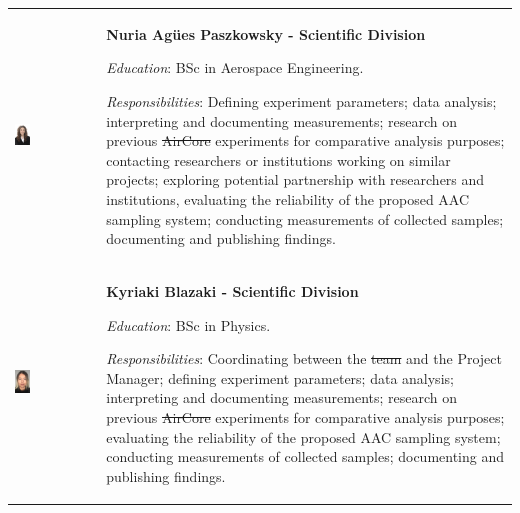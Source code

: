 \documentclass[a4paper,12pt,twoside, final]{article}
\providecommand{\DIFaddtex}[1]{{\protect\color{blue}\uwave{#1}}} %
\providecommand{\DIFdeltex}[1]{{\protect\color{red}\sout{#1}}}                      %
\providecommand{\DIFaddbegin}{} %
\providecommand{\DIFaddend}{} %
\providecommand{\DIFdelbegin}{} %
\providecommand{\DIFdelend}{} %
\providecommand{\DIFadd}[1]{\texorpdfstring{\DIFaddtex{#1}}{#1}} %
\providecommand{\DIFdel}[1]{\texorpdfstring{\DIFdeltex{#1}}{}} %
\newcommand{\DIFscaledelfig}{0.5}
\newlength{\DIFdelgraphicswidth} %
\newlength{\DIFdelgraphicsheight} %
\newcommand{\DIFaddincludegraphics}[2][]{{\color{blue}\fbox{\DIFOincludegraphics[#1]{#2}}}} %
\newcommand{\DIFdelincludegraphics}[2][]{%
\sbox{\DIFdelgraphicsbox}{\DIFOincludegraphics[#1]{#2}}%
\settoboxwidth{\DIFdelgraphicswidth}{\DIFdelgraphicsbox} %
\settoboxtotalheight{\DIFdelgraphicsheight}{\DIFdelgraphicsbox} %
\scalebox{\DIFscaledelfig}{%
\parbox[b]{\DIFdelgraphicswidth}{\usebox{\DIFdelgraphicsbox}\\[-\baselineskip] \rule{\DIFdelgraphicswidth}{0em}}\llap{\resizebox{\DIFdelgraphicswidth}{\DIFdelgraphicsheight}{%
\setlength{\unitlength}{\DIFdelgraphicswidth}%
\begin{picture}(1,1)%
\thicklines\linethickness{2pt} %
{\color[rgb]{1,0,0}\put(0,0){\framebox(1,1){}}}%
{\color[rgb]{1,0,0}\put(0,0){\line( 1,1){1}}}%
{\color[rgb]{1,0,0}\put(0,1){\line(1,-1){1}}}%
\end{picture}%
}\hspace*{3pt}}} %
} %
\DeclareRobustCommand{\DIFaddbegin}{\DIFOaddbegin \let\includegraphics\DIFaddincludegraphics} %
\DeclareRobustCommand{\DIFaddend}{\DIFOaddend \let\includegraphics\DIFOincludegraphics} %
\DeclareRobustCommand{\DIFdelbegin}{\DIFOdelbegin \let\includegraphics\DIFdelincludegraphics} %
\DeclareRobustCommand{\DIFdelend}{\DIFOaddend \let\includegraphics\DIFOincludegraphics} %
\begin{document}
\begin{longtable}[]{m{} m{}}
\DIFaddend \includegraphics[width=0.2\textwidth]{1-introduction/img/agues-paszkowsky.jpg} & \textbf{Nuria Agües Paszkowsky - Scientific Division}

\smallskip
\textit{Education}: BSc in Aerospace Engineering.

\smallskip
\textit{Responsibilities}: Defining experiment parameters; data analysis; interpreting and documenting measurements; research on previous \DIFdelbegin \DIFdel{AirCore }\DIFdelend \DIFaddbegin \DIFadd{CAC }\DIFaddend experiments for comparative analysis purposes; contacting researchers or institutions working on similar projects; exploring potential partnership with researchers and institutions, evaluating the reliability of the proposed AAC sampling system; conducting measurements of collected samples; documenting and publishing findings. 
\bigskip
\\

\includegraphics[width=0.2\textwidth]{1-introduction/img/kiki-blazaki.jpg} & \textbf{Kyriaki Blazaki - Scientific Division}

\smallskip
\textit{Education}: BSc in Physics.


\smallskip
\textit{Responsibilities}: Coordinating between the \DIFdelbegin \DIFdel{team }\DIFdelend \DIFaddbegin \DIFadd{Scientific Division }\DIFaddend and the Project Manager; defining experiment parameters; data analysis; interpreting and documenting measurements; research on previous \DIFdelbegin \DIFdel{AirCore }\DIFdelend \DIFaddbegin \DIFadd{CAC }\DIFaddend experiments for comparative analysis purposes; evaluating the reliability of the proposed AAC sampling system; conducting measurements of collected samples; documenting and publishing findings. 
\bigskip
\\


\end{longtable}
\end{document}
